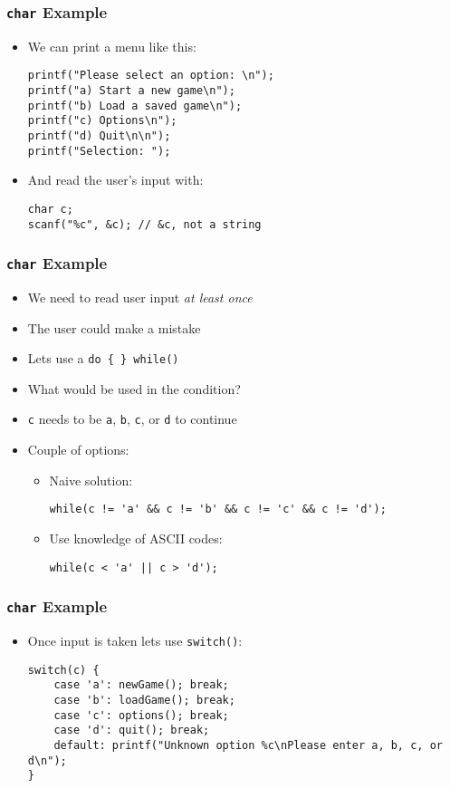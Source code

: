 \documentclass[14pt]{beamer}
\begin{document}
\begin{frame}[fragile]
\frametitle{\texttt{char} Example}
\begin{itemize}
\item We can print a menu like this:
\begin{lstlisting}[style=CStyle]
printf("Please select an option: \n");
printf("a) Start a new game\n");
printf("b) Load a saved game\n");
printf("c) Options\n");
printf("d) Quit\n\n");
printf("Selection: ");
\end{lstlisting}
\pause
\item And read the user's input with:
\begin{lstlisting}[style=CStyle]
char c;
scanf("%c", &c); // &c, not a string
\end{lstlisting}
\end{itemize}
\end{frame}

\begin{frame}[fragile]
\frametitle{\texttt{char} Example}
\begin{itemize}
\item We need to read user input \textit{at least once}
\item The user could make a mistake
\item Lets use a \texttt{do \{ \} while()}
\pause
\item What would be used in the condition?
\pause
\item \texttt{c} needs to be \texttt{a}, \texttt{b}, \texttt{c}, or \texttt{d} to continue
\pause
\item Couple of options:
	\begin{itemize}
		\item Naive solution:
\begin{lstlisting}[style=CStyle]
while(c != 'a' && c != 'b' && c != 'c' && c != 'd');
\end{lstlisting}
		\item Use knowledge of ASCII codes:
\begin{lstlisting}[style=CStyle]
while(c < 'a' || c > 'd');
\end{lstlisting}
	\end{itemize}
\end{itemize}
\end{frame}

\begin{frame}[fragile]
\frametitle{\texttt{char} Example}
\begin{itemize}
\item Once input is taken lets use \texttt{switch()}:
\begin{lstlisting}[style=CStyle]
switch(c) {
	case 'a': newGame(); break;
	case 'b': loadGame(); break;
	case 'c': options(); break;
	case 'd': quit(); break;
	default: printf("Unknown option %c\nPlease enter a, b, c, or d\n");
}
\end{lstlisting}
\end{itemize}
\end{frame}
\end{document}
